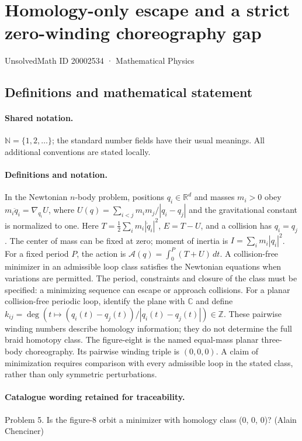 \documentclass[11pt]{article}
\begin{document}
\setcounter{section}{20002533}
\section{Homology-only escape and a strict zero-winding choreography gap}\label{20002534}
{\small UnsolvedMath ID 20002534 · Mathematical Physics}
\subsection{Definitions and mathematical statement}

\paragraph{Shared notation.}$\mathbb N=\{1,2,\ldots\}$; the standard number fields have their usual meanings. All additional conventions are stated locally.


\paragraph{Definitions and notation.}In the Newtonian $n$-body problem, positions $q_i\in\mathbb R^d$ and masses $m_i>0$ obey $m_i\ddot q_i=\nabla_{q_i}U$, where $U(q)=\sum_{i<j}m_im_j/|q_i-q_j|$ and the gravitational constant is normalized to one. Here $T=\tfrac12\sum_i m_i|\dot q_i|^2$, $E=T-U$, and a collision has $q_i=q_j$. The center of mass can be fixed at zero; moment of inertia is $I=\sum_i m_i|q_i|^2$. For a fixed period $P$, the action is $\mathcal A(q)=\int_0^P(T+U)\,dt$. A collision-free minimizer in an admissible loop class satisfies the Newtonian equations when variations are permitted. The period, constraints and closure of the class must be specified: a minimizing sequence can escape or approach collisions. For a planar collision-free periodic loop, identify the plane with $\mathbb C$ and define $k_{ij}=\deg(t\mapsto(q_i(t)-q_j(t))/|q_i(t)-q_j(t)|)\in\mathbb Z$. These pairwise winding numbers describe homology information; they do not determine the full braid homotopy class. The figure-eight is the named equal-mass planar three-body choreography. Its pairwise winding triple is $(0,0,0)$. A claim of minimization requires comparison with every admissible loop in the stated class, rather than only symmetric perturbations.

\paragraph{Catalogue wording retained for traceability.}
Problem 5. Is the figure-8 orbit a minimizer with homology class (0, 0, 0)? (Alain Chenciner)
\end{document}
